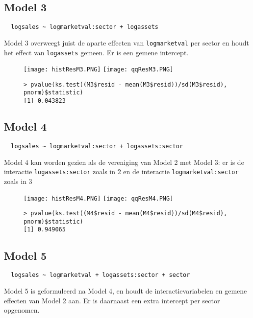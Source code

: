 \documentclass[a4paper, notitlepage]{report}
\begin{document}
\subsection{Model 3}
\begin{verbatim}
  logsales ~ logmarketval:sector + logassets
\end{verbatim}
  Model 3 overweegt juist de aparte effecten van \verb!logmarketval! per sector en houdt het effect van \verb!logassets! gemeen. Er is een gemene intercept.
  
  \begin{figure}
  \begin{center}
    \texttt{[image: histResM3.PNG]}
    \texttt{[image: qqResM3.PNG]}
  \end{center}
  \begin{verbatim}
> pvalue(ks.test((M3$resid - mean(M3$resid))/sd(M3$resid), pnorm)$statistic)
[1] 0.043823
  \end{verbatim}
  \end{figure}
  
\subsection{Model 4}
\begin{verbatim}
  logsales ~ logmarketval:sector + logassets:sector
\end{verbatim}
  Model 4 kan worden gezien als de vereniging van Model 2 met Model 3: er is de interactie \verb!logassets:sector! zoals in 2 en de interactie \verb!logmarketval:sector! zoals in 3
  
  \begin{figure}
  \begin{center}
    \texttt{[image: histResM4.PNG]}
    \texttt{[image: qqResM4.PNG]}
  \end{center}
  \begin{verbatim}
> pvalue(ks.test((M4$resid - mean(M4$resid))/sd(M4$resid), pnorm)$statistic)
[1] 0.949065
  \end{verbatim}
  \end{figure}
  
\subsection{Model 5}
\begin{verbatim}
  logsales ~ logmarketval + logassets:sector + sector
\end{verbatim}
  Model 5 is geformuleerd na Model 4, en houdt de interactievariabelen en gemene effecten van Model 2 aan. Er is daarnaast een extra intercept per sector opgenomen.
  
\end{document}
